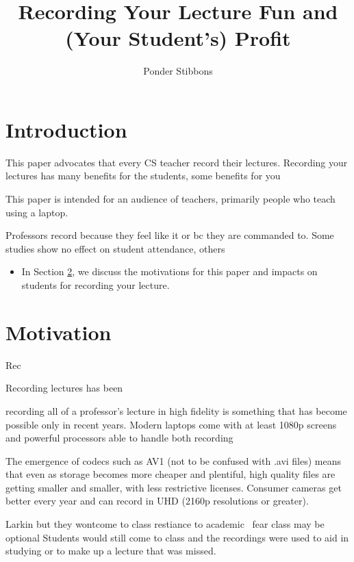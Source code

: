 \documentclass[sigconf]{acmart}
\title{Recording Your Lecture Fun and (Your Student's) Profit}
\author{Ponder Stibbons}
\affiliation{\institution{Unseen University}}
\begin{document}
\maketitle



\section{Introduction}


This paper advocates that every CS teacher record their lectures.
Recording your lectures has many benefits for the students, some benefits for you

This paper is intended for an audience of teachers, primarily people who teach using a laptop.


Professors record because they feel like it or bc they are commanded to.
Some studies show no effect on student attendance,
others 


\begin{itemize}
	\item In Section \ref{why}, we discuss the motivations for this paper and impacts  on students for recording your lecture.
\end{itemize}
\section{Motivation}
\label{why}
Rec

Recording lectures has been

recording all of a professor's lecture in high fidelity is something that has become possible only in recent years.
Modern laptops come with at least 1080p screens and powerful processors able to handle both recording 

The emergence of codecs such as AV1 \cite{AV1comp} (not to be confused with .avi files) means that even as storage becomes more cheaper and plentiful, high quality files are getting smaller and smaller, with less restrictive licenses. 
Consumer cameras get better every year and can record in UHD (2160p resolutions or greater).



Larkin but they wontcome to class restiance to academic \
fear class may be optional
Students would still come to class and the recordings were used to aid in studying or to make up a lecture that was missed.
\end{document}
